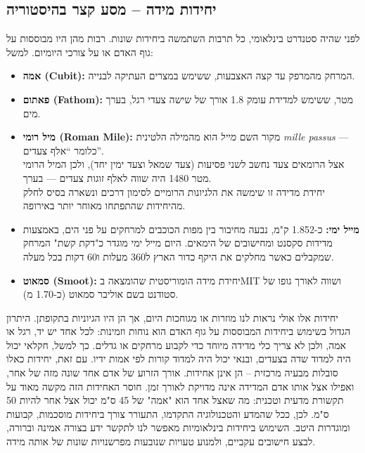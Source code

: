 \documentclass[
  hebrew,
  letterpaper,
  DIV=11,
  numbers=noendperiod]{scrreprt}
\begin{document}
\subsection{\texorpdfstring{{יחידות מידה -- מסע קצר
בהיסטוריה}}{יחידות מידה -- מסע קצר בהיסטוריה}}\label{ux5d9ux5d7ux5d9ux5d3ux5d5ux5ea-ux5deux5d9ux5d3ux5d4-ux5deux5e1ux5e2-ux5e7ux5e6ux5e8-ux5d1ux5d4ux5d9ux5e1ux5d8ux5d5ux5e8ux5d9ux5d4}

{לפני שהיה סטנדרט בינלאומי, כל תרבות השתמשה ביחידות שונות. רבות מהן היו
מבוססות על גוף האדם או על צורכי היומיום. למשל}:

\begin{itemize}
\item
  \textbf{{אמה} (Cubit):} {המרחק מהמרפק עד קצה האצבעות, ששימש במצרים
  העתיקה לבנייה}.
\item
  \textbf{פאתום (Fathom):} אורך של שישה צעדי רגל, בערך ‎1.8‎ מטר, ששימש
  למדידת עומק מים.
\item
  \textbf{מיל רומי (Roman Mile):} מקור השם \emph{מייל} הוא מהמילה
  הלטינית \emph{mille passus} --- כלומר ``אלף צעדים''.\\
  אצל הרומאים צעד נחשב לשני פסיעות (צעד שמאל וצעד ימין יחד), ולכן המיל
  הרומי היה שווה לאלף זוגות צעדים --- בערך ‎1480‎ מטר.\\
  יחידת מדידה זו שימשה את הלגיונות הרומיים לסימון דרכים ונשארה בסיס לחלק
  מהיחידות שהתפתחו מאוחר יותר באירופה.
\item
  \textbf{{מייל ימי}:} {כ-1.852 ק"מ, נבעה מחיבור בין מפות הכוכבים
  למרחקים על פני הים, באמצעות מדידות סקסנט ומחישובים של הימאים. היום
  מייל ימי מוגדר כ"דקת קשת" המרחק שמקבלים כאשר מחלקים את היקף כדור הארץ
  ל360 מעלות ו60 דקות בכל מעלה.}
\item
  \textbf{{סמאוט} (Smoot):} {יחידת מידה הומוריסטית שהומצאה ב}MIT {ושווה
  לאורך גופו של סטודנט בשם אוליבר סמאוט (כ}-{1.70 מ\textquotesingle)}.
\end{itemize}

{יחידות אלו אולי נראות לנו מוזרות או מגוחכות היום, אך הן היו הגיוניות
בתקופתן. היתרון הגדול בשימוש ביחידות המבוססות על גוף האדם הוא נוחות
וזמינות: לכל אחד יש יד, רגל או אמה, ולכן לא צריך כלי מדידה מיוחד כדי
לקבוע מרחקים או גדלים. כך למשל, חקלאי יכול היה למדוד שדה בצעדים, ובנאי
יכול היה למדוד קורות לפי אמות ידיו. עם זאת, יחידות כאלו סובלות מבעיה
מרכזית -- הן אינן אחידות. אורך הזרוע של אדם אחד שונה מזה של אחר, ואפילו
אצל אותו אדם המדידה אינה מדויקת לאורך זמן. חוסר האחידות הזה מקשה מאוד על
תקשורת מדעית וטכנית: מה שאצל אחד הוא "אמה" של 45 ס"מ יכול אצל אחר להיות
50 ס"מ. לכן, ככל שהמדע והטכנולוגיה התקדמו, התעורר צורך ביחידות מוסכמות,
קבועות ומוגדרות היטב. השימוש ביחידות בינלאומיות מאפשר לנו לתקשר ידע
בצורה אמינה וברורה, לבצע חישובים עקביים, ולמנוע טעויות שנובעות מפרשנויות
שונות של אותה מידה}.
\end{document}
